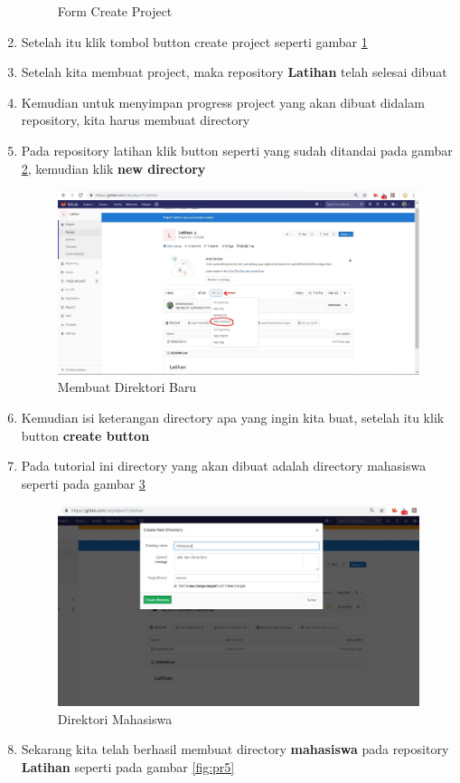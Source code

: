 \begin{enumerate}
\begin{figure}[!htbp]
\caption{Form Create Project}
\label{fig:pr2}
\end{figure}
\item Setelah itu klik tombol button create project seperti gambar \ref{fig:pr2}
\item Setelah kita membuat project, maka repository \textbf{Latihan} telah selesai dibuat
\item Kemudian untuk menyimpan progress project yang akan dibuat didalam repository, kita harus membuat directory 
\item Pada repository latihan klik button seperti yang sudah ditandai pada gambar \ref{fig:pr3}, kemudian klik \textbf{new directory}  
\subitem
\begin{figure}[!htbp]
\centerline{\includegraphics[width=.75\textwidth]{Figures/gitlab/pr3.JPG}}
\caption{Membuat Direktori Baru}
\label{fig:pr3}
\end{figure}
\item Kemudian isi keterangan directory apa yang ingin kita buat, setelah itu klik button \textbf{create button}
\item Pada tutorial ini directory yang akan dibuat adalah directory mahasiswa seperti pada gambar \ref{fig:pr4}
\subitem
\begin{figure}[!htbp]
\centerline{\includegraphics[width=.75\textwidth]{Figures/gitlab/pr4.JPG}}
\caption{Direktori Mahasiswa}
\label{fig:pr4}
\end{figure}
\item Sekarang kita telah berhasil membuat directory \textbf{mahasiswa} pada repository \textbf{Latihan} seperti pada gambar \ref{fig:pr5}

\end{enumerate}
